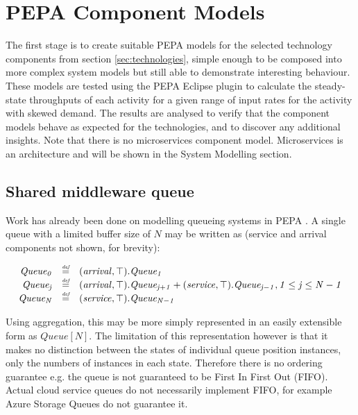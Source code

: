 %
%

\section{PEPA Component Models}\label{sec:pepa-component-models}

The first stage is to create suitable PEPA models for the selected technology components from section \ref{sec:technologies}, simple enough to be composed into more complex system models but still able to demonstrate interesting behaviour.  These models are tested using the PEPA Eclipse plugin \cite{RN1080} to calculate the steady-state throughputs of each activity for a given range of input rates for the activity with skewed demand.  The results are analysed to verify that the component models behave as expected for the technologies, and to discover any additional insights.  Note that there is no microservices component model.  Microservices is an architecture and will be shown in the System Modelling section.

%
%
\FloatBarrier
\subsection{Shared middleware queue}

Work has already been done on modelling queueing systems in PEPA \cite{RN75}.  A single queue with a limited buffer size of $\mathit{N}$ may be written as (service and arrival components not shown, for brevity):

\begin{center}
\begin{displaymath}
\begin{array}{rcl}
\mathit{Queue_0} & \stackrel{\mbox{\em {\tiny def}}}{=} & (\mathit{arrival},\mathit{\top}).\mathit{Queue_1}\\
\mathit{Queue_j} & \stackrel{\mbox{\em {\tiny def}}}{=} & (\mathit{arrival},\mathit{\top}).\mathit{Queue_{j+1}} + (\mathit{service},\mathit{\top}).\mathit{Queue_{j-1}}, \mathit{1 \le j \le N-1}\\
\mathit{Queue_N} & \stackrel{\mbox{\em {\tiny def}}}{=} & (\mathit{service},\mathit{\top}).\mathit{Queue_{N-1}}\\
\end{array}
\end{displaymath}
\end{center}

Using aggregation, this may be more simply represented in an easily extensible form as $\mathit{Queue[N]}$.  The limitation of this representation however is that it makes no distinction between the states of individual queue position instances, only the numbers of instances in each state.  Therefore there is no ordering guarantee e.g. the queue is not guaranteed to be First In First Out (FIFO).  Actual cloud service queues do not necessarily implement FIFO, for example Azure Storage Queues \cite{RN1072} do not guarantee it.

